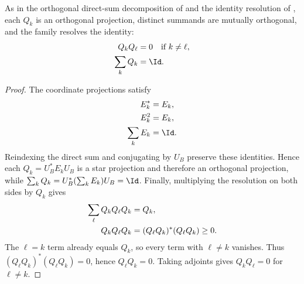 \begin{lemma}
    \label{thm:mpdo_hayashi_sector_projection_resolution}
    \leanok
    As in the orthogonal direct-sum decomposition of
    \cite[Appendix~C.2, lines~1364--1368]{Cirac2016MPDO_arXiv} and the
    identity resolution of
    \cite[Appendix~C.2, lines~1693--1697]{Cirac2016MPDO_arXiv}, each $Q_k$ is
    an orthogonal projection, distinct summands are mutually orthogonal, and
    the family resolves the identity:
    \begin{align}
        Q_kQ_\ell  & =0 \quad\text{if } k\ne\ell,
        \notag                                    \\
        \sum_k Q_k & =\Id.
        \notag
    \end{align}
\end{lemma}

\begin{proof}
    \leanok
    The coordinate projections satisfy
    \begin{align}
        E_k^*      & =E_k,
        \notag             \\
        E_k^2      & =E_k,
        \notag             \\
        \sum_k E_k & =\Id.
        \notag
    \end{align}
    Reindexing the direct sum and conjugating by $U_B$ preserve these
    identities. Hence each $Q_k=U_B^*E_kU_B$ is a star projection and
    therefore an orthogonal projection, while
    $\sum_k Q_k=U_B^*(\sum_kE_k)U_B=\Id$. Finally, multiplying the resolution
    on both sides by $Q_k$ gives
    \begin{align}
        \sum_\ell Q_kQ_\ell Q_k & =Q_k,
        \notag                                                      \\
        Q_kQ_\ell Q_k           & =(Q_\ell Q_k)^*(Q_\ell Q_k)\geq0.
        \notag
    \end{align}
    The $\ell=k$ term already equals $Q_k$, so every term with $\ell\ne k$
    vanishes. Thus $(Q_\ell Q_k)^*(Q_\ell Q_k)=0$, hence
    $Q_\ell Q_k=0$. Taking adjoints gives $Q_kQ_\ell=0$ for $\ell\ne k$.
\end{proof}

